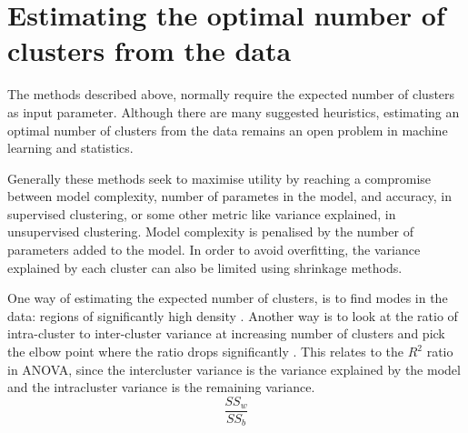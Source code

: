 \section{Estimating the optimal number of clusters from the data}

The methods described above, normally require the expected number of clusters as input parameter.
Although there are many suggested heuristics,
estimating an optimal number of clusters from the data remains an open problem in machine learning and statistics.



Generally these methods seek to maximise utility by reaching a compromise between model complexity, number of parametes in the model,
and accuracy, in supervised clustering, or some other metric like variance explained, in unsupervised clustering.
Model complexity is penalised by the number of parameters added to the model.
In order to avoid overfitting, the variance explained by each cluster can also be limited using shrinkage methods.

One way of estimating the expected number of clusters, is to find modes in the data: regions of significantly high density \citep{Duong:2008eu,JING:2012ek}.
Another way is to look at the ratio of intra-cluster to inter-cluster variance at increasing number of clusters and pick the elbow point
where the ratio drops significantly \citep{Tibshirani:2001fj}.
This relates to the $R^2$ ratio in \gls{ANOVA}, since the intercluster variance is the variance explained by the model and the intracluster variance is the remaining variance.
\[ 
  \frac{SS_{w}}{SS_{b}}
\]

